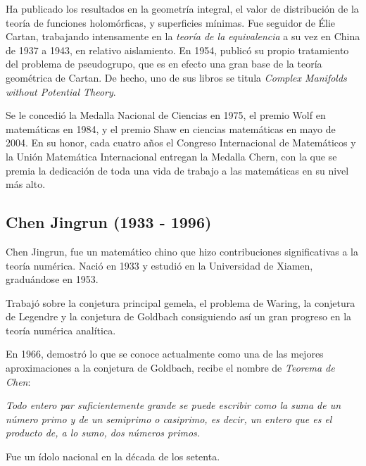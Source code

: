 \documentclass[a4paper, 11pt]{article}
\begin{document}
		Ha publicado los resultados en la geometría integral, el valor de distribución de la teoría de funciones
		holomórficas, y superficies mínimas. Fue seguidor de Élie Cartan, trabajando intensamente en la \textit{teoría
		de la equivalencia} a su vez en China de 1937 a 1943, en relativo aislamiento. En 1954, publicó su propio
		tratamiento del problema de pseudogrupo, que es en efecto una gran base de la teoría geométrica de Cartan.
		De hecho, uno de sus libros se titula \textit{Complex Manifolds without Potential Theory}.
		
		Se le concedió la Medalla Nacional de Ciencias en 1975, el premio Wolf en matemáticas en 1984, y el premio Shaw
		en ciencias matemáticas en mayo de 2004. En su honor, cada cuatro años el Congreso Internacional de Matemáticos y
		la Unión Matemática Internacional entregan la Medalla Chern, con la que se premia la dedicación de toda una vida
		de trabajo a las matemáticas en su nivel más alto.
			
	\subsection{Chen Jingrun (1933 - 1996)}
		Chen Jingrun, fue un matemático chino que hizo contribuciones significativas a la teoría numérica. Nació en 1933
		y estudió en la Universidad de Xiamen, graduándose en 1953.
		
		Trabajó sobre la conjetura principal gemela, el problema de Waring, la conjetura de Legendre y la conjetura de
		Goldbach consiguiendo así un gran progreso en la teoría numérica analítica.
		
		En 1966, demostró lo que se conoce actualmente como una de las mejores aproximaciones a la conjetura de Goldbach,
		recibe el nombre de \textit{Teorema de Chen}:
		
		\begin{center}
			\em
			Todo entero par suficientemente grande se puede escribir como la suma de un número primo y de un semiprimo
			o casiprimo, es decir, un entero que es el producto de, a lo sumo, dos números primos.
		\end{center} 
		
		Fue un ídolo nacional en la década de los setenta.
				
\end{document}

